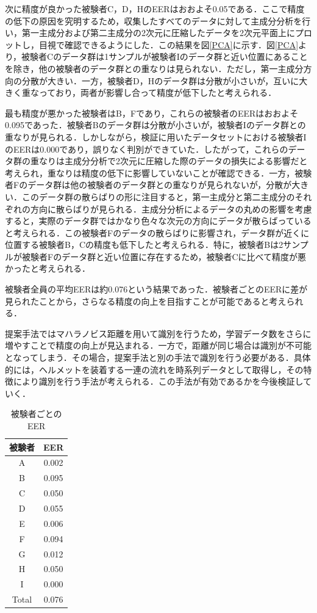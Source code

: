 次に精度が良かった被験者C，D，HのEERはおおよそ0.05である．ここで精度の低下の原因を究明するため，収集したすべてのデータに対して主成分分析を行い，第一主成分および第二主成分の2次元に圧縮したデータを2次元平面上にプロットし，目視で確認できるようにした．この結果を図\ref{PCA}に示す．図\ref{PCA}より，被験者Cのデータ群は1サンプルが被験者Iのデータ群と近い位置にあることを除き，他の被験者のデータ群との重なりは見られない．ただし，第一主成分方向の分散が大きい．一方，被験者D，Hのデータ群は分散が小さいが，互いに大きく重なっており，両者が影響し合って精度が低下したと考えられる．

最も精度が悪かった被験者はB，Fであり，これらの被験者のEERはおおよそ0.095であった．被験者Bのデータ群は分散が小さいが，被験者Iのデータ群との重なりが見られる．しかしながら，検証に用いたデータセットにおける被験者IのEERは0.000であり，誤りなく判別ができていた．したがって，これらのデータ群の重なりは主成分分析で2次元に圧縮した際のデータの損失による影響だと考えられ，重なりは精度の低下に影響していないことが確認できる．一方，被験者Fのデータ群は他の被験者のデータ群との重なりが見られないが，分散が大きい．このデータ群の散らばりの形に注目すると，第一主成分と第二主成分のそれぞれの方向に散らばりが見られる．主成分分析によるデータの丸めの影響を考慮すると，実際のデータ群ではかなり色々な次元の方向にデータが散らばっていると考えられる．この被験者Fのデータの散らばりに影響され，データ群が近くに位置する被験者B，Cの精度も低下したと考えられる．特に，被験者Bは2サンプルが被験者Fのデータ群と近い位置に存在するため，被験者Cに比べて精度が悪かったと考えられる．

被験者全員の平均EERは約0.076という結果であった．被験者ごとのEERに差が見られたことから，さらなる精度の向上を目指すことが可能であると考えられる．

提案手法ではマハラノビス距離を用いて識別を行うため，学習データ数をさらに増やすことで精度の向上が見込まれる．一方で，距離が同じ場合は識別が不可能となってしまう．その場合，提案手法と別の手法で識別を行う必要がある．具体的には，ヘルメットを装着する一連の流れを時系列データとして取得し，その特徴により識別を行う手法が考えられる．この手法が有効であるかを今後検証していく．

\begin{table}[!t]
  \centering
  \caption{被験者ごとのEER}
  \begin{tabular}{c|c} \hline\hline
    被験者 & EER \\ \hline
    A & 0.002 \\
    B & 0.095 \\
    C & 0.050 \\
    D & 0.055 \\
    E & 0.006 \\
    F & 0.094 \\
    G & 0.012 \\
    H & 0.050 \\
    I & 0.000 \\ \hline
    Total & 0.076 \\ \hline
  \end{tabular}
  \label{EER_num}
\end{table}

